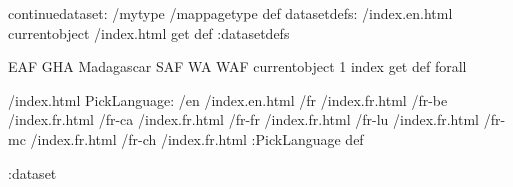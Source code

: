 \begin{ingrid}
continuedataset:
/mytype /mappagetype def
datasetdefs:
/index.en.html currentobject /index.html get def
:datasetdefs

{ EAF GHA Madagascar SAF WA WAF } { currentobject 1 index get def } forall

/index.html {
PickLanguage:
/en /index.en.html
/fr /index.fr.html
/fr-be /index.fr.html
/fr-ca /index.fr.html
/fr-fr /index.fr.html
/fr-lu /index.fr.html
/fr-mc /index.fr.html
/fr-ch /index.fr.html
:PickLanguage
} def

:dataset
\end{ingrid}
